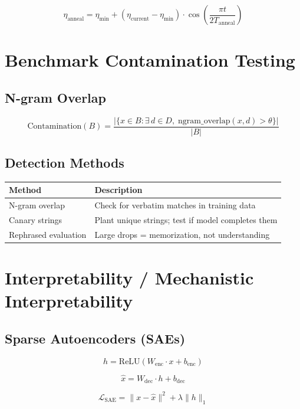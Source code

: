 \documentclass[11pt,a4paper]{article}
\begin{document}
$$\eta_{\text{anneal}} = \eta_{\min} + (\eta_{\text{current}} - \eta_{\min}) \cdot \cos\!\left(\frac{\pi t}{2 T_{\text{anneal}}}\right)$$

\section{Benchmark Contamination Testing}

\subsection{N-gram Overlap}

$$\text{Contamination}(B) = \frac{|\{x \in B : \exists\, d \in D,\; \text{ngram\_overlap}(x, d) > \theta\}|}{|B|}$$

\subsection{Detection Methods}

\begin{center}
\begin{tabular}{L{4cm}L{10cm}}
\toprule
\textbf{Method} & \textbf{Description} \\
\midrule
N-gram overlap & Check for verbatim matches in training data \\
Canary strings & Plant unique strings; test if model completes them \\
Rephrased evaluation & Large drops = memorization, not understanding \\
\bottomrule
\end{tabular}
\end{center}

\section{Interpretability / Mechanistic Interpretability}

\subsection{Sparse Autoencoders (SAEs)}

$$h = \text{ReLU}(W_{\text{enc}} \cdot x + b_{\text{enc}})$$

$$\hat{x} = W_{\text{dec}} \cdot h + b_{\text{dec}}$$

$$\mathcal{L}_{\text{SAE}} = \|x - \hat{x}\|^2 + \lambda \|h\|_1$$
\end{document}
